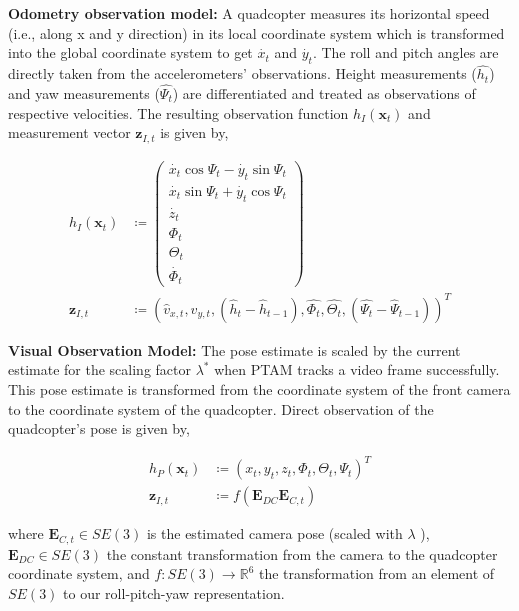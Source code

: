 \textbf{Odometry observation model:} A quadcopter measures its horizontal speed
(i.e., along x and y direction) in its local coordinate system which is
transformed into the global coordinate system to get $\dot{x_t}$ and
$\dot{y_t}$. The roll and pitch angles are directly taken from the
accelerometers' observations. Height measurements ($\hat{h_t}$) and yaw measurements
($\hat{{\Psi}_t}$) are differentiated and treated as observations of respective
velocities. The resulting observation function $h_I(\mathbf{x}_t)$ and
measurement vector $\mathbf{z}_{I,t}$ is given by,
\begin{ceqn}

\begin{align}
	h_I(\mathbf{x}_t) &\coloneqq  
	\begin{pmatrix} 
		\dot{x_t}\cos{{\Psi}_t} - \dot{y_t}\sin{{\Psi}_t} \\
		\dot{x_t}\sin{{\Psi}_t} + \dot{y_t}\cos{{\Psi}_t} \\
		\dot{z_t} \\
		{\Phi}_t \\
		{\Theta}_t \\
		\dot{{\Phi}_t}   	
	\end{pmatrix}
	\\
	\mathbf{z}_{I,t} &\coloneqq (\hat{v}_{x,t}, \hat{v}_{y,t}, (\hat{h}_t -
	\hat{h}_{t-1}), \hat{{\Phi}_t}, \hat{{\Theta}_t}, (\hat{{\Psi}_t} - \hat{{\Psi}}_{t-1}  ) )^T
\end{align}
\end{ceqn}
\textbf{Visual Observation Model:} The pose estimate is scaled by the
current estimate for the scaling factor ${\lambda}^{*}$ when PTAM tracks a
video frame successfully. This pose estimate is transformed from the coordinate
system of the front camera to the coordinate system of the quadcopter. Direct
observation of the quadcopter’s pose is given by,
\begin{ceqn}

\begin{align}
	  h_P(\mathbf{x}_t) &\coloneqq  {(x_t, y_t, z_t, {\Phi}_t, {\Theta}_t,
	  {\Psi}_t)}^T \\
	  \mathbf{z}_{I,t} &\coloneqq
	  f(\mathbf{E}_{\mathit{DC}}\mathbf{E}_{\mathit{C},t} )
\end{align}
\end{ceqn}

where $\mathbf{E}_{\mathit{C},t} \in SE(3)$ is the estimated camera pose (scaled
with $\lambda$ ), $\mathbf{E}_{\mathit{DC}} \in SE(3)$ the constant
transformation from the camera to the quadcopter coordinate system, and $f :
SE(3) \rightarrow \mathbb{R}^6$ the transformation from an element of $SE(3)$ to
our roll-pitch-yaw representation.

